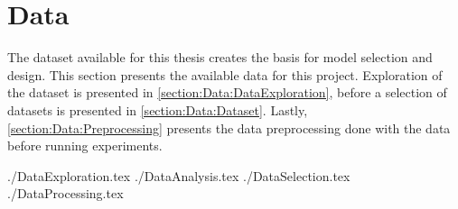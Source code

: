 \chapter{Data}
\label{section:Data}




The dataset available for this thesis creates the basis for model selection and design.
This section presents the available data for this project.
Exploration of the dataset is presented in \cref{section:Data:DataExploration},
before a selection of datasets is presented in \cref{section:Data:Dataset}.
Lastly, \cref{section:Data:Preprocessing} presents the data preprocessing done with the data before running experiments.

{./DataExploration.tex}
{./DataAnalysis.tex}
{./DataSelection.tex}
{./DataProcessing.tex}
